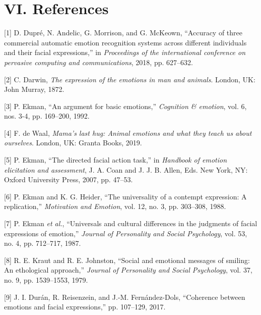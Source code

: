 \documentclass[conference,final,]{IEEEtran}
\begin{document}
\hypertarget{references}{%
\section{VI. References}\label{references}}

\footnotesize

\hypertarget{refs}{}
\leavevmode\hypertarget{ref-dupre2018accuracy}{}%
{[}1{]} D. Dupré, N. Andelic, G. Morrison, and G. McKeown, ``Accuracy of
three commercial automatic emotion recognition systems across different
individuals and their facial expressions,'' in \emph{Proceedings of the
international conference on pervasive computing and communications},
2018, pp. 627--632.

\leavevmode\hypertarget{ref-darwin1872expression}{}%
{[}2{]} C. Darwin, \emph{The expression of the emotions in man and
animals}. London, UK: John Murray, 1872.

\leavevmode\hypertarget{ref-ekman1992argument}{}%
{[}3{]} P. Ekman, ``An argument for basic emotions,'' \emph{Cognition \&
emotion}, vol. 6, nos. 3-4, pp. 169--200, 1992.

\leavevmode\hypertarget{ref-de2019mama}{}%
{[}4{]} F. de Waal, \emph{Mama's last hug: Animal emotions and what they
teach us about ourselves}. London, UK: Granta Books, 2019.

\leavevmode\hypertarget{ref-ekman2007directed}{}%
{[}5{]} P. Ekman, ``The directed facial action task,'' in \emph{Handbook
of emotion elicitation and assessment}, J. A. Coan and J. J. B. Allen,
Eds. New York, NY: Oxford University Press, 2007, pp. 47--53.

\leavevmode\hypertarget{ref-ekman1988universality}{}%
{[}6{]} P. Ekman and K. G. Heider, ``The universality of a contempt
expression: A replication,'' \emph{Motivation and Emotion}, vol. 12, no.
3, pp. 303--308, 1988.

\leavevmode\hypertarget{ref-ekman1987universals}{}%
{[}7{]} P. Ekman \emph{et al.}, ``Universals and cultural differences in
the judgments of facial expressions of emotion,'' \emph{Journal of
Personality and Social Psychology}, vol. 53, no. 4, pp. 712--717, 1987.

\leavevmode\hypertarget{ref-kraut1979social}{}%
{[}8{]} R. E. Kraut and R. E. Johnston, ``Social and emotional messages
of smiling: An ethological approach,'' \emph{Journal of Personality and
Social Psychology}, vol. 37, no. 9, pp. 1539--1553, 1979.

\leavevmode\hypertarget{ref-duran2017coherence}{}%
{[}9{]} J. I. Durán, R. Reisenzein, and J.-M. Fernández-Dols,
``Coherence between emotions and facial expressions,'' pp. 107--129,
2017.
\end{document}
